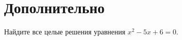 \section*{Дополнительно}

\begin{exercise}
Найдите все целые решения уравнения $x^2 - 5x + 6 = 0$.
\end{exercise}
